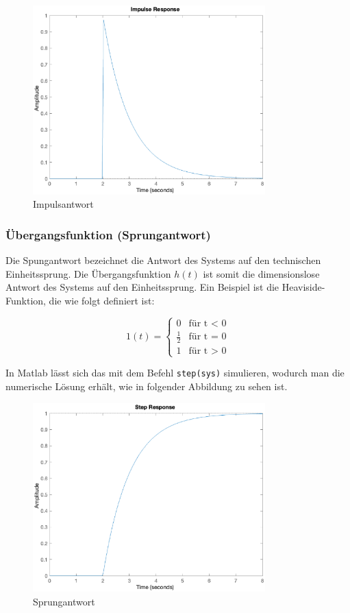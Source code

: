\begin{figure}[H]
    \label{fig:impuls}
    \centering
    \includegraphics[width=0.8\textwidth]{Bilder/ImpulsAntwortPT1Tt.eps}
    \caption{Impulsantwort}
 \end{figure}

\subsubsection{Übergangsfunktion (Sprungantwort)}

Die Spungantwort bezeichnet die Antwort des Systems auf den technischen Einheitssprung.
Die Übergangsfunktion $h(t)$ ist somit die dimensionslose Antwort des Systems auf den Einheitssprung.
Ein Beispiel ist die Heaviside-Funktion, die wie folgt definiert ist:

\[
1 (t) = \begin{cases} 
    0 & \text{für t < 0} \\ 
    \frac{1}{2} & \text{für t = 0} \\
    1 & \text{für t > 0} \end{cases}  
\]

In Matlab lässt sich das mit dem Befehl \texttt{step(sys)} simulieren, wodurch man die numerische Lösung erhält, wie in folgender Abbildung zu sehen ist.

\begin{figure}[H]
    \label{fig:sprung}
    \centering
    \includegraphics[width=0.8\textwidth]{Bilder/SprungantwortPT1Tt.eps}
    \caption{Sprungantwort}
 \end{figure}

